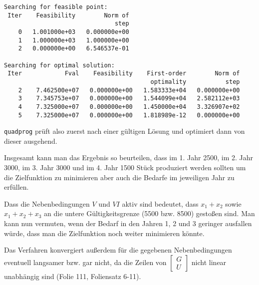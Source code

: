 \documentclass[a4paper, 12pt]{report}
\begin{document}
\begin{lstlisting}
Searching for feasible point:
 Iter    Feasibility        Norm of  
                               step
    0   1.001000e+03   0.000000e+00  
    1   1.000000e+03   1.000000e+00  
    2   0.000000e+00   6.546537e-01  

Searching for optimal solution:
 Iter            Fval    Feasibility    First-order        Norm of  
                                         optimality           step
    2    7.462500e+07   0.000000e+00   1.583333e+04   0.000000e+00  
    3    7.345753e+07   0.000000e+00   1.544099e+04   2.582112e+03  
    4    7.325000e+07   0.000000e+00   1.450000e+04   3.326907e+02  
    5    7.325000e+07   0.000000e+00   1.818989e-12   0.000000e+00\end{lstlisting}

\lstinline[basicstyle=\ttfamily\color{black}]|quadprog| prüft also zuerst nach einer gültigen Lösung und optimiert dann von dieser
ausgehend.\par
Insgesamt kann man das Ergebnis so beurteilen, dass im 1. Jahr 2500, im 2. Jahr 3000, im 3. Jahr 3000 und im 4. Jahr 1500 Stück
produziert werden sollten um die Zielfunktion zu minimieren aber auch die Bedarfe im jeweiligen Jahr zu erfüllen.\par
Dass die Nebenbedingungen $V$ und $VI$ aktiv sind bedeutet, dass $x_1 + x_2$ sowie $x_1 + x_2 + x_3$ an die untere
Gültigkeitsgrenze (5500 bzw. 8500) gestoßen sind. Man kann nun vermuten, wenn der Bedarf in den Jahren 1, 2 und 3 geringer
ausfallen würde, dass man die Zielfunktion noch weiter minimieren könnte.\par
Das Verfahren konvergiert außerdem für die gegebenen Nebenbedingungen eventuell langsamer bzw. gar nicht, da die Zeilen
von $\begin{bmatrix}G\\U\end{bmatrix}$ nicht linear unabhängig sind (Folie 111, Foliensatz 6-11).
\end{document}
